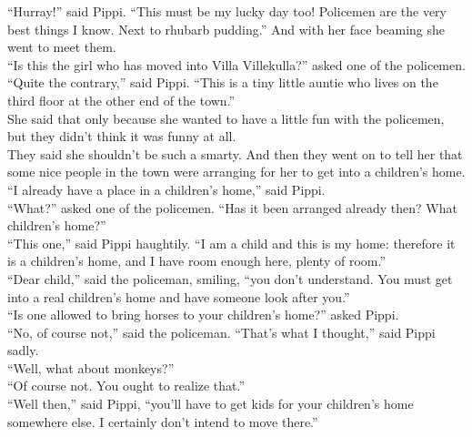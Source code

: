 \documentclass{standard}
\begin{document}
“Hurray!” said Pippi. “This must be my lucky day too! Policemen are the very best things I know. Next to rhubarb pudding.” And with her face beaming she went to meet them.\\

“Is this the girl who has moved into Villa Villekulla?” asked one of the policemen.\\

“Quite the contrary,” said Pippi. “This is a tiny little auntie who lives on the third floor at the other end of the town.”\\

She said that only because she wanted to have a little fun with the policemen, but they didn’t think it was funny at all.\\

They said she shouldn’t be such a smarty. And then they went on to tell her that some nice people in the town were arranging for her to get into a children’s home.\\

“I already have a place in a children’s home,” said Pippi.\\

“What?” asked one of the policemen. “Has it been arranged already then? What children’s home?”\\

“This one,” said Pippi haughtily. “I am a child and this is my home: therefore it is a children’s home, and I have room enough here, plenty of room.”\\

“Dear child,” said the policeman, smiling, “you don’t understand. You must get into a real children’s home and have someone look after you.”\\

“Is one allowed to bring horses to your children’s home?” asked Pippi.\\

“No, of course not,” said the policeman. “That’s what I thought,” said Pippi sadly.\\

“Well, what about monkeys?”\\

“Of course not. You ought to realize that.”\\

“Well then,” said Pippi, “you’ll have to get kids for your children’s home somewhere else. I certainly don’t intend to move there.”\\
\end{document}
